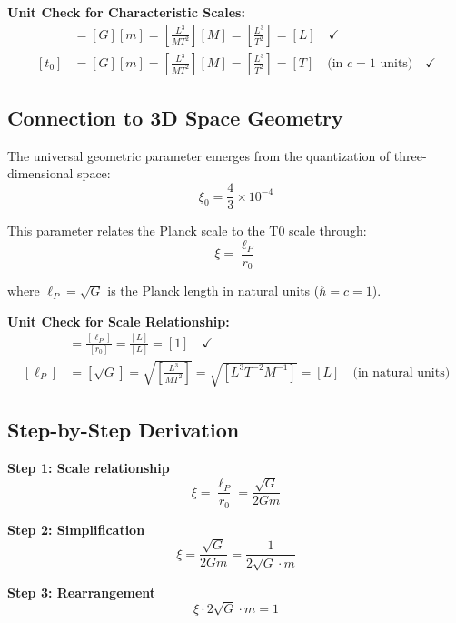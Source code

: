 \documentclass[12pt,a4paper]{article}
\newcommand{\xiconst}{\xi_0 = \frac{4}{3} \times 10^{-4}}
\theoremstyle{definition}
\begin{document}
	 
		\textbf{Unit Check for Characteristic Scales:}
		\begin{align}
			[r_0] &= [G][m] = \left[\frac{L^3}{MT^2}\right][M] = \left[\frac{L^3}{T^2}\right] = [L] \quad \checkmark \\
			[t_0] &= [G][m] = \left[\frac{L^3}{MT^2}\right][M] = \left[\frac{L^3}{T^2}\right] = [T] \quad \text{(in } c=1 \text{ units)} \quad \checkmark
		\end{align}
	 
	
	\subsection{Connection to 3D Space Geometry}
	
	The universal geometric parameter emerges from the quantization of three-dimensional space:
	\begin{equation}
		\xiconst
	\end{equation}
	
	This parameter relates the Planck scale to the T0 scale through:
	\begin{equation}
		\xi = \frac{\ell_P}{r_0}
	\end{equation}
	
	where $\ell_P = \sqrt{G}$ is the Planck length in natural units ($\hbar = c = 1$).
	
	 
		\textbf{Unit Check for Scale Relationship:}
		\begin{align}
			[\xi] &= \frac{[\ell_P]}{[r_0]} = \frac{[L]}{[L]} = [1] \quad \checkmark \\
			[\ell_P] &= [\sqrt{G}] = \sqrt{\left[\frac{L^3}{MT^2}\right]} = \sqrt{[L^3T^{-2}M^{-1}]} = [L] \quad \text{(in natural units)}
		\end{align}
	 
	
	\subsection{Step-by-Step Derivation}
	
	\textbf{Step 1: Scale relationship}
	\begin{equation}
		\xi = \frac{\ell_P}{r_0} = \frac{\sqrt{G}}{2Gm}
	\end{equation}
	
	\textbf{Step 2: Simplification}
	\begin{equation}
		\xi = \frac{\sqrt{G}}{2Gm} = \frac{1}{2\sqrt{G} \cdot m}
	\end{equation}
	
	\textbf{Step 3: Rearrangement}
	\begin{equation}
		\xi \cdot 2\sqrt{G} \cdot m = 1
	\end{equation}
	
\end{document}
